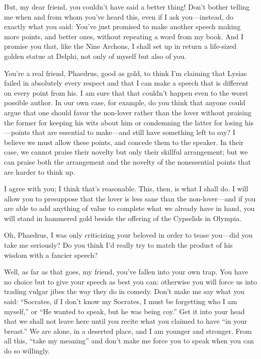 \sayphaedrus But, my dear friend, you couldn’t have said a better thing!
Don’t bother telling me when and from whom you’ve heard this, even if I
ask you---instead, do exactly what you said: You’ve just promised to
make another speech making more points, and better ones, without
repeating a word from my book. And I promise you that, like the Nine
Archons, I shall set up in return a life-sized golden statue at
Delphi, not only of myself but also of
you.

\saysocrates You’re a real friend, Phaedrus, good as gold, to think I’m
claiming that Lysias failed in absolutely every respect and that I can
make a speech that is different on every point from his. I am sure that
that couldn’t happen even to the worst possible author. In our own case,
for example, do you think that anyone could argue that one should favor
the non-lover rather than the lover without praising the former for
keeping his wits about him or condemning the latter for
losing his---points that are essential to make---and still have
something left to say? I believe we must allow these points, and concede
them to the speaker. In their case, we cannot praise their novelty but
only their skillful arrangement; but we can praise both the arrangement
and the novelty of the nonessential points that are harder to think up.

\sayphaedrus I agree with you; I think that’s reasonable. This, then, is
what I shall do. I will allow you to presuppose that the lover is less
sane than the non-lover---and if you are able to add anything of
value to complete what we already have in hand, you will stand in
hammered gold beside the offering of the Cypselids in
Olympia.

\saysocrates Oh, Phaedrus, I was only criticizing your beloved in order to
tease you---did you take me seriously? Do you think I’d really try to
match the product of his wisdom with a fancier speech?

\sayphaedrus Well, as far as that goes, my friend, you’ve fallen into your
own trap. You have no choice but to give your speech as best you can: 
otherwise you will force us into trading vulgar jibes the way
they do in comedy. Don’t make me say what you said: “Socrates, if I
don’t know my Socrates, I must be forgetting who I am myself,” or “He
wanted to speak, but he was being coy.” Get it into your head that we
shall not leave here until you recite what you claimed to have “in your
breast.” We are alone, in a deserted place, and I am younger and
stronger. From all this, “take my
meaning” and don’t
make me force you to speak when you can do so willingly.

